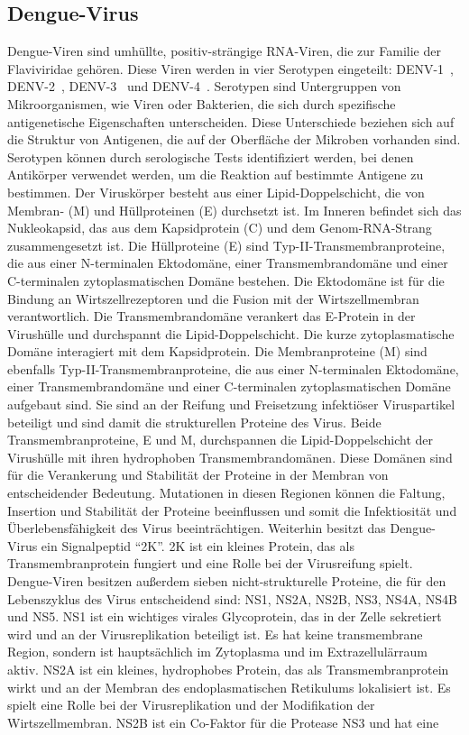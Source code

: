 \documentclass[german,version-2022-01]{uzl-thesis}
\begin{document}
\subsection{Dengue-Virus}
Dengue-Viren sind umh\"ullte, positiv-str\"angige RNA-Viren, die zur Familie der Flaviviridae geh\"oren. Diese Viren werden in vier Serotypen eingeteilt: DENV-1~\cite{tittarelli_dengue_2014}, DENV-2~\cite{cao_retrospective_2023}, DENV-3~\cite{peyrefitte_genetic_2003} und DENV-4~\cite{wardhani_genetic_2023}. Serotypen sind Untergruppen von Mikroorganismen, wie Viren oder Bakterien, die sich durch spezifische antigenetische Eigenschaften unterscheiden. Diese Unterschiede beziehen sich auf die Struktur von Antigenen, die auf der Oberfl\"ache der Mikroben vorhanden sind. Serotypen k\"onnen durch serologische Tests identifiziert werden, bei denen Antik\"orper verwendet werden, um die Reaktion auf bestimmte Antigene zu bestimmen. Der Virusk\"orper besteht aus einer Lipid-Doppelschicht, die von Membran- (M) und H\"ullproteinen (E) durchsetzt ist. Im Inneren befindet sich das Nukleokapsid, das aus dem Kapsidprotein (C) und dem Genom-RNA-Strang zusammengesetzt ist. Die H\"ullproteine (E) sind Typ-II-Transmembranproteine, die aus einer N-terminalen Ektodom\"ane, einer Transmembrandom\"ane und einer C-terminalen zytoplasmatischen Dom\"ane bestehen. Die Ektodom\"ane ist f\"ur die Bindung an Wirtszellrezeptoren und die Fusion mit der Wirtszellmembran verantwortlich. Die Transmembrandom\"ane verankert das E-Protein in der Virush\"ulle und durchspannt die Lipid-Doppelschicht. Die kurze zytoplasmatische Dom\"ane interagiert mit dem Kapsidprotein. Die Membranproteine (M) sind ebenfalls Typ-II-Transmembranproteine, die aus einer N-terminalen Ektodom\"ane, einer Transmembrandom\"ane und einer C-terminalen zytoplasmatischen Dom\"ane aufgebaut sind. Sie sind an der Reifung und Freisetzung infekti\"oser Viruspartikel beteiligt und sind damit die strukturellen Proteine des Virus. Beide Transmembranproteine, E und M, durchspannen die Lipid-Doppelschicht der Virush\"ulle mit ihren hydrophoben Transmembrandom\"anen. Diese Dom\"anen sind f\"ur die Verankerung und Stabilit\"at der Proteine in der Membran von entscheidender Bedeutung. Mutationen in diesen Regionen k\"onnen die Faltung, Insertion und Stabilit\"at der Proteine beeinflussen und somit die Infektiosit\"at und \"Uberlebensf\"ahigkeit des Virus beeintr\"achtigen. Weiterhin besitzt das Dengue-Virus ein Signalpeptid "`2K"'. 2K ist ein kleines Protein, das als Transmembranprotein fungiert und eine Rolle bei der Virusreifung spielt. Dengue-Viren besitzen au\ss{}erdem sieben nicht-strukturelle Proteine, die f\"ur den Lebenszyklus des Virus entscheidend sind: NS1, NS2A, NS2B, NS3, NS4A, NS4B und NS5. NS1 ist ein wichtiges virales Glycoprotein, das in der Zelle sekretiert wird und an der Virusreplikation beteiligt ist. Es hat keine transmembrane Region, sondern ist haupts\"achlich im Zytoplasma und im Extrazellul\"arraum aktiv. NS2A ist ein kleines, hydrophobes Protein, das als Transmembranprotein wirkt und an der Membran des endoplasmatischen Retikulums lokalisiert ist. Es spielt eine Rolle bei der Virusreplikation und der Modifikation der Wirtszellmembran. NS2B ist ein Co-Faktor f\"ur die Protease NS3 und hat eine 
\end{document}
